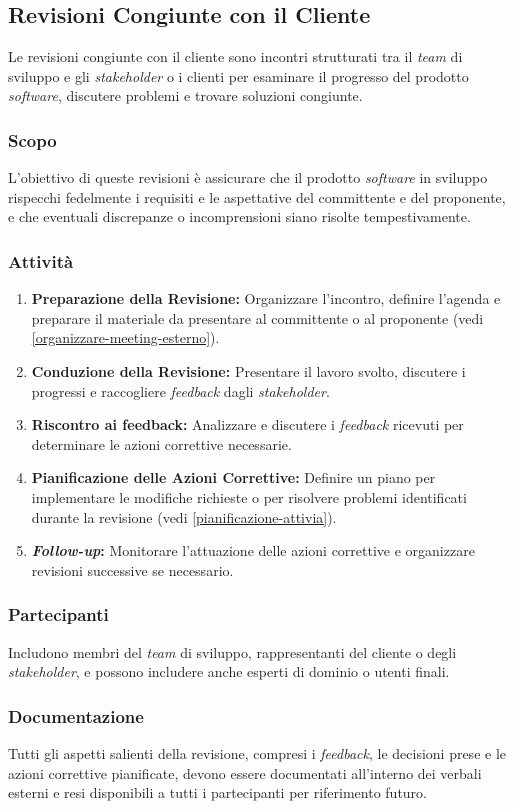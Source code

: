 \subsection{Revisioni Congiunte con il Cliente}

Le revisioni congiunte con il cliente sono incontri strutturati tra il \textit{team} di
sviluppo e gli \textit{stakeholder} o i clienti per esaminare il progresso del
prodotto \textit{software}, discutere problemi e trovare soluzioni congiunte.

\subsubsection{Scopo}
L'obiettivo di queste revisioni è assicurare che il prodotto \textit{software}
in sviluppo rispecchi fedelmente i requisiti e le aspettative del committente e
del proponente, e che eventuali discrepanze o incomprensioni siano risolte
tempestivamente.

\subsubsection{Attività}
\begin{enumerate}
	\item \textbf{Preparazione della Revisione:} Organizzare l'incontro,
	      definire l'agenda e preparare il materiale da presentare al
	      committente o al proponente (vedi
	      \cref{organizzare-meeting-esterno}).
	\item \textbf{Conduzione della Revisione:} Presentare il lavoro svolto,
	      discutere i progressi e raccogliere \textit{feedback\g} dagli
	      \textit{stakeholder}.
	\item \textbf{Riscontro ai feedback\g:} Analizzare e discutere i
	      \textit{feedback\g} ricevuti per determinare le azioni correttive
	      necessarie.
	\item \textbf{Pianificazione delle Azioni Correttive:} Definire un piano per
	      implementare le modifiche richieste o per risolvere problemi
	      identificati durante la revisione (vedi
	      \cref{pianificazione-attivia}).
	\item \textbf{\textit{Follow-up}:} Monitorare l'attuazione delle azioni
	      correttive e organizzare revisioni successive se necessario.
\end{enumerate}

\subsubsection{Partecipanti}
Includono membri del \textit{team} di sviluppo, rappresentanti del cliente o degli
\textit{stakeholder}, e possono includere anche esperti di dominio o utenti
finali.

\subsubsection{Documentazione}
Tutti gli aspetti salienti della revisione, compresi i \textit{feedback\g}, le
decisioni prese e le azioni correttive pianificate, devono essere documentati
all'interno dei verbali esterni e resi disponibili a tutti i partecipanti per
riferimento futuro.
